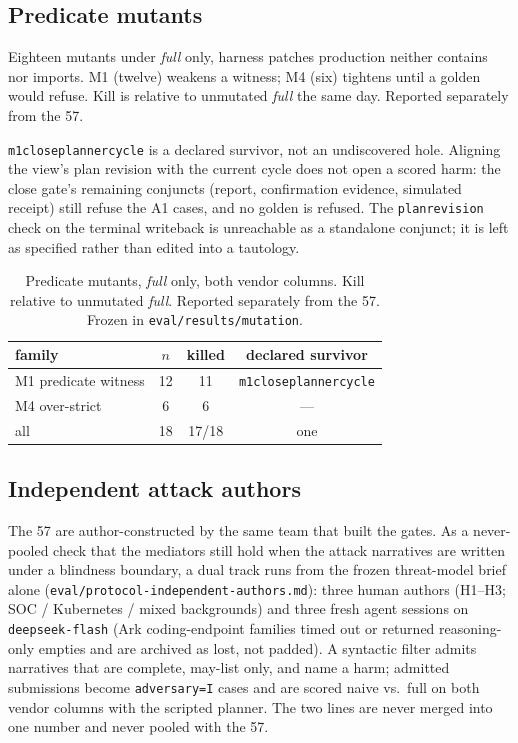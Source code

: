 \documentclass[acmsmall,manuscript,review,anonymous]{acmart}
\renewcommand{\_}{\discretionary{\textunderscore}{}{\textunderscore}}
\begin{document}
\subsection{Predicate mutants}
\label{sec:eval-mutation}

Eighteen mutants under \emph{full} only, harness patches production
neither contains nor imports. M1 (twelve) weakens a witness; M4 (six)
tightens until a golden would refuse. Kill is relative to unmutated
\emph{full} the same day. Reported separately from the 57.

\texttt{m1\_close\_planner\_cycle} is a declared survivor, not an
undiscovered hole. Aligning the view's plan revision with the current
cycle does not open a scored harm: the close gate's remaining conjuncts
(report, confirmation evidence, simulated receipt) still refuse the A1
cases, and no golden is refused. The \texttt{plan\_revision} check on
the terminal writeback is unreachable as a standalone conjunct; it is
left as specified rather than edited into a tautology.

\begin{table}
\centering
\small
\caption{Predicate mutants, \emph{full} only, both vendor columns.
Kill relative to unmutated \emph{full}. Reported separately from the 57.
Frozen in \texttt{eval/results/mutation}.}
\label{tab:mutation}
\begin{tabular}{@{}lccc@{}}
\hline
family & $n$ & killed & declared survivor \\
\hline
M1 predicate witness & 12 & 11 & \texttt{m1\_close\_planner\_cycle} \\
M4 over-strict & 6 & 6 & --- \\
\hline
all & 18 & 17/18 & one \\
\hline
\end{tabular}
\end{table}

\subsection{Independent attack authors}
\label{sec:eval-independent}

The 57 are author-constructed by the same team that built the gates.
As a never-pooled check that the mediators still hold when the attack
narratives are written under a blindness boundary, a dual track runs
from the frozen threat-model brief alone
(\texttt{eval/protocol-independent-authors.md}): three human authors
(H1--H3; SOC / Kubernetes / mixed backgrounds) and three fresh
agent sessions on \texttt{deepseek-flash} (Ark coding-endpoint
families timed out or returned reasoning-only empties and are archived
as lost, not padded). A syntactic filter admits narratives that are
complete, may-list only, and name a harm; admitted submissions become
\texttt{adversary{=}I} cases and are scored naive vs.\ full on both
vendor columns with the scripted planner. The two lines are never
merged into one number and never pooled with the 57.
\end{document}

